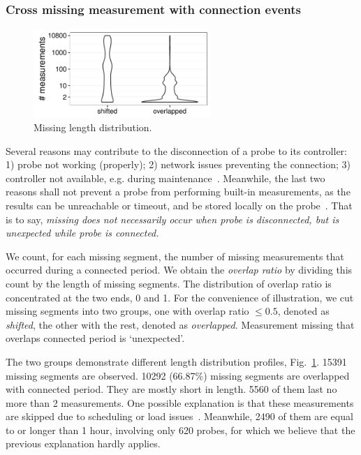 \subsubsection{Cross missing measurement with connection events}

\begin{figure}[!htb]
\centering
\includegraphics[width=0.6\textwidth]{gfx/chap3/len_by_ratio.pdf}
\caption{Missing length distribution.}
\label{fig:len_ratio}
\end{figure}

Several reasons may contribute to the disconnection of a probe to its controller: 1) probe not working (properly); 2) network issues preventing the connection; 3) controller not available, e.g. during maintenance~\cite{controller}. Meanwhile, the last two reasons shall not prevent a probe from performing built-in measurements, as the results can be unreachable or timeout, and be stored locally on the probe~\cite{usb}. 
That is to say, \textit{missing does not necessarily occur when probe is disconnected, but is unexpected while probe is connected.}

We count, for each missing segment, the number of missing measurements that occurred during a connected period.
We obtain the \textit{overlap ratio} by dividing this count by the length of missing segments. 
The distribution of overlap ratio is concentrated at the two ends, 0 and 1. 
For the convenience of illustration, we cut missing segments into two groups, one with overlap ratio $\leq0.5$, denoted as \textit{shifted}, the other with the rest, denoted as \textit{overlapped}.
Measurement missing that overlaps connected period is `unexpected'.

The two groups demonstrate different length distribution profiles, Fig.~\ref{fig:len_ratio}.
15391 missing segments are observed. 
10292 (66.87\%) missing segments are overlapped with connected period. 
They are mostly short in length. 5560 of them last no more than 2 measurements. 
One possible explanation is that these measurements are skipped due to scheduling or load issues~\cite{schedule, Holterbach2015a}.
Meanwhile, 2490 of them are equal to or longer than 1 hour, involving only 620 probes, for which we believe that the previous explanation hardly applies.

